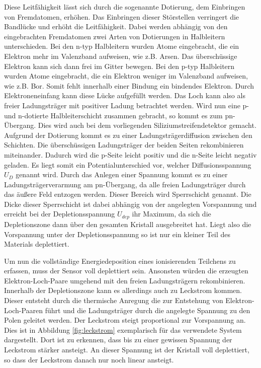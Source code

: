 Diese Leitfähigkeit lässt sich durch die sogenannte Dotierung, dem Einbringen von Fremdatomen, erhöhen.
Das Einbringen dieser Störstellen verringert die Bandlücke und erhöht die Leitfähigkeit.
Dabei werden abhängig von den eingebrachten Fremdatomen zwei Arten von Dotierungen in Halbleitern unterschieden.
Bei den n-typ Halbleitern wurden Atome eingebracht, die ein Elektron mehr im Valenzband aufweisen, wie z.B. Arsen.
Das überschüssige Elektron kann sich dann frei im Gitter bewegen.
Bei den p-typ Halbleitern wurden Atome eingebracht, die ein Elektron weniger im Valenzband aufweisen, wie z.B. Bor.
Somit fehlt innerhalb einer Bindung ein bindendes Elektron.
Durch Elektroneneinfang kann diese Lücke aufgefüllt werden.
Das Loch kann also als freier Ladungsträger mit positiver Ladung betrachtet werden.
Wird nun eine p- und n-dotierte Halbleiterschicht zusammen gebracht, so kommt es zum pn-Übergang.
Dies wird auch bei dem vorliegenden Siliziumstreifendetektor gemacht.
Aufgrund der Dotierung kommt es zu einer Ladungsträgerdiffusion zwischen den Schichten.
Die überschüssigen Ladungsträger der beiden Seiten rekombinieren miteinander.
Dadurch wird die p-Seite leicht positiv und die n-Seite leicht negativ geladen.
Es liegt somit ein Potentialunterschied vor, welcher Diffusionsspannung $U_D$ genannt wird.
Durch das Anlegen einer Spannung kommt es zu einer Ladungsträgerverarmung am pn-Übergang, da alle freien Ladungsträger durch das äußere Feld entzogen werden.
Dieser Bereich wird Sperrschicht genannt.
Die Dicke dieser Sperrschicht ist dabei abhängig von der angelegten Vorspannung und erreicht bei der Depletionsspannung $U_{dep}$ ihr Maximum, da sich die Depletionszone dann über den gesamten Kristall ausgebreitet hat.
Liegt also die Vorspannung unter der Depletionsspannung so ist nur ein kleiner Teil des Materials deplettiert.

Um nun die vollständige Energiedeposition eines ionisierenden Teilchens zu erfassen, muss der Sensor voll deplettiert sein.
Ansonsten würden die erzeugten Elektron-Loch-Paare umgehend mit den freien Ladungsträgern rekombinieren.
Innerhalb der Depletionszone kann es allerdings auch zu Leckstrom kommen.
Dieser entsteht durch die thermische Anregung die zur Entstehung von Elektron-Loch-Paaren führt und die Ladungsträger durch die angelegte Spannung zu den Polen geleitet werden.
Der Leckstrom steigt proportional zur Vorspannung an.
Dies ist in Abbildung \ref{fig:leckstrom} exemplarisch für das verwendete System dargestellt.
Dort ist zu erkennen, dass bis zu einer gewissen Spannung der Leckstrom stärker ansteigt.
An dieser Spannung ist der Kristall voll deplettiert, so dass der Leckstrom danach nur noch linear ansteigt.

